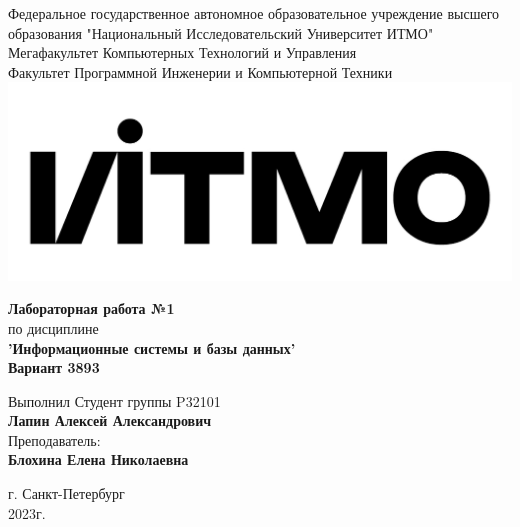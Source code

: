 \documentclass[12pt,onecolumn]{article}
\begin{document}
\setcounter{tocdepth}{4}
\begin{center}
    Федеральное государственное автономное образовательное учреждение высшего образования "Национальный Исследовательский Университет ИТМО"\\ 
    Мегафакультет Компьютерных Технологий и Управления\\
    Факультет Программной Инженерии и Компьютерной Техники \\
    \includegraphics[scale=0.3]{image/itmo.jpg} %
\end{center}
\vspace{1cm}


\begin{center}
    \textbf{Лабораторная работа №1}\\
    по дисциплине\\
    \textbf{'Информационные системы и базы данных'}\\
    \textbf{Вариант 3893}
\end{center}

\vspace{2cm}

\begin{flushright}
  Выполнил Студент  группы P32101\\
  \textbf{Лапин Алексей Александрович}\\
  Преподаватель: \\
  \textbf{Блохина Елена Николаевна}\\
\end{flushright}

\vspace{6cm}
\begin{center}
    г. Санкт-Петербург\\
    2023г.
\end{center}

\newpage
\tableofcontents
\newpage
\end{document}
